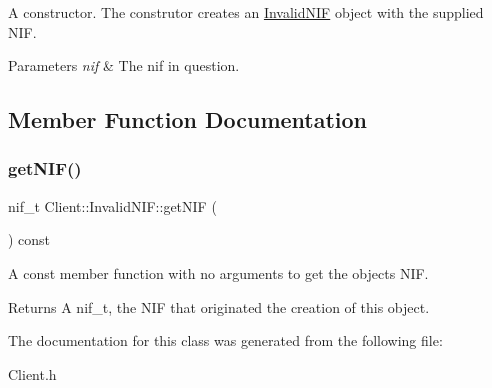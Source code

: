 A constructor. The construtor creates an \hyperlink{class_client_1_1_invalid_n_i_f}{Invalid\+N\+IF} object with the supplied N\+IF. 
\begin{DoxyParams}{Parameters}
{\em nif} & The nif in question. \\
\hline
\end{DoxyParams}


\subsection{Member Function Documentation}
\hypertarget{class_client_1_1_invalid_n_i_f_a9ce8fd030fcd6ea099d40e3c53495684}{}\label{class_client_1_1_invalid_n_i_f_a9ce8fd030fcd6ea099d40e3c53495684} 
\subsubsection{\texorpdfstring{get\+N\+I\+F()}{getNIF()}}
{\footnotesize\ttfamily nif\+\_\+t Client\+::\+Invalid\+N\+I\+F\+::get\+N\+IF (\begin{DoxyParamCaption}{ }\end{DoxyParamCaption}) const\hspace{0.3cm}{\ttfamily [inline]}}

A const member function with no arguments to get the object\textquotesingle{}s N\+IF. \begin{DoxyReturn}{Returns}
A nif\+\_\+t, the N\+IF that originated the creation of this object. 
\end{DoxyReturn}


The documentation for this class was generated from the following file\+:\begin{DoxyCompactItemize}
\item 
Client.\+h\end{DoxyCompactItemize}

